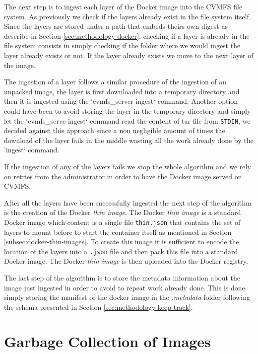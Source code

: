 The next step is to ingest each layer of the Docker image into the
CVMFS file system. As previously we check if the layers already exist in the
file system itself. Since the layers are stored under a path that embeds theirs
own digest as describe in Section \ref{sec:methodology-docker}, checking if a layer is already in the
file system consists in simply checking if the folder where we would ingest the
layer already exists or not.  If the layer already exists we move to the next
layer of the image.

The ingestion of a layer follows a similar procedure of the ingestion of an
unpacked image, the layer is first downloaded into a temporary directory and
then it is ingested using the `cvmfs\_server ingest` command. Another option could
have been to avoid storing the layer in the temporary directory and simply let
the `cvmfs\_serve ingest` command read the content of tar file from
\texttt{STDIN}, we decided against this approach since a non negligible amount
of times the download of the layer fails in the middle wasting all the work
already done by the 'ingest` command.

If the ingestion of any of the layers fails we stop the whole algorithm and we
rely on retries from the administrator in order to have the Docker image served
on CVMFS.

After all the layers have been successfully ingested the next step of the
algorithm is the creation of the Docker \textit{thin image}. The Docker
\textit{thin image} is a standard Docker image which content is a single file
\texttt{thin.json} that contains the set of layers to mount before to start the
container itself as mentioned in Section \ref{subsec:docker-thin-images}. To create this image it is
sufficient to encode the location of the layers into a \texttt{.json} file and then
pack this file into a standard Docker image. The Docker \textit{thin image} is
then uploaded into the Docker registry.

The last step of the algorithm is to store the metadata information about the
image just ingested in order to avoid to repeat work already done. This is done
simply storing the manifest of the docker image in the \textit{.metadata}
folder following the schema presented in Section \ref{sec:methodology-keep-track}.

\section{Garbage Collection of Images}\label{sec:implementation-gc}

